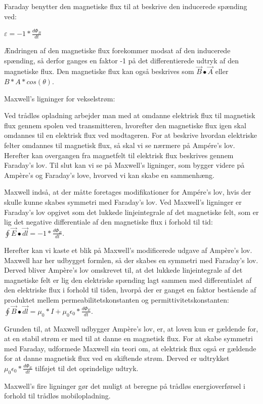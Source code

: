 Faraday benytter den magnetiske flux til at beskrive den inducerede spænding ved:

\centerline{$\varepsilon = -1 * \frac{d \Phi_B}{dt}$}

Ændringen af den magnetiske flux forekommer modsat af den inducerede spænding, så derfor ganges en faktor -1 på det differentierede udtryk af den magnetiske flux. Den magnetiske flux kan også beskrives som $\vec{B} \bullet \vec{A}$ eller $B * A * cos(\theta)$.

Maxwell's ligninger for vekselstrøm:

Ved trådløs opladning arbejder man med at omdanne elektrisk flux til magnetisk flux gennem spolen ved transmitteren, hvorefter den magnetiske flux igen skal omdannes til en elektrisk flux ved modtageren. For at beskrive hvordan elektriske felter omdannes til magnetisk flux, så skal vi se nærmere på Ampére's lov. Herefter kan overgangen fra magnetfelt til elektrisk flux beskrives gennem Faraday's lov. Til slut kan vi se på Maxwell's ligninger, som bygger videre på Ampère's og Faraday's love, hvorved vi kan skabe en sammenhæng.

Maxwell indså, at der måtte foretages modifikationer for Ampére's lov, hvis der skulle kunne skabes symmetri med Faraday's lov. Ved Maxwell's ligninger er Faraday's lov opgivet som det lukkede linjeintegrale af det magnetiske felt, som er lig det negative differentiale af den magnetiske flux i forhold til tid: $\oint \vec{E} \bullet \vec{dl} = -1 * \frac{d \Phi_B}{dt}$.

Herefter kan vi kaste et blik på Maxwell's modificerede udgave af Ampère's lov. Maxwell har her udbygget formlen, så der skabes en symmetri med Faraday's lov. Derved bliver Ampère's lov omskrevet til, at det lukkede linjeintegrale af det magnetiske felt er lig den elektriske spænding lagt sammen med differentialet af den elektriske flux i forhold til tiden, hvorpå der er ganget en faktor bestående af produktet mellem permeabilitetskonstanten og permittivitetskonstanten: $\oint \vec{B} \bullet \vec{dl} = \mu_0 * I + \mu_0 \epsilon_0 * \frac{d \Phi_E}{dt}$.

Grunden til, at Maxwell udbygger Ampère's lov, er, at loven kun er gældende for, at en stabil strøm er med til at danne en magnetisk flux. For at skabe symmetri med Faraday, udformede Maxwell sin teori om, at elektrisk flux også er gældende for at danne magnetisk flux ved en skiftende strøm. Derved er udtrykket $\mu_0 \epsilon_0 * \frac{d \Phi_E}{dt}$ tilføjet til det oprindelige udtryk.

Maxwell's fire ligninger gør det muligt at beregne på trådløs energioverførsel i forhold til trådløs mobilopladning.

\newpage